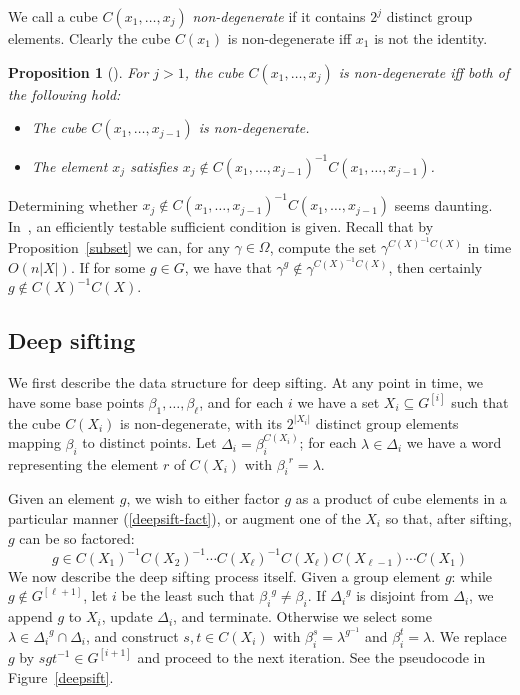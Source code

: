 \documentclass[12pt]{article}
\newtheorem{proposition}[theorem]{Proposition}
\begin{document}
We call a cube $C(x_1,\ldots,x_j)$ {\em non-degenerate}\/ if it
contains $2^j$ distinct group elements.  Clearly the cube
$C(x_1)$ is non-degenerate iff $x_1$ is not the identity.
\begin{proposition}[\cite{BabaiSzemeredi1984}]
  For $j>1$,
  the cube $C(x_1,\ldots,x_j)$ is non-degenerate iff both
  of the following hold:
  \begin{itemize}
    \item The
      cube $C(x_1,\ldots,x_{j-1})$ is non-degenerate.
    \item The element $x_j$ satisfies
      $x_j\not\in C(x_1,\ldots,x_{j-1})^{-1}C(x_1,\ldots,x_{j-1})$.
  \end{itemize}
\end{proposition}
Determining whether $x_j\not\in C(x_1,\ldots,x_{j-1})^{-1}C(x_1,\ldots,x_{j-1})$
seems daunting.
In~\cite{babai1991nearly}, an efficiently testable sufficient condition is
given.  Recall that
by Proposition~\ref{subset} we can, for any $\gamma\in\Omega$,
compute the set $\gamma^{C(X)^{-1}C(X)}$
in time $O(n|X|)$.
If for some $g\in G$,
we have that $\gamma^g\not\in\gamma^{C(X)^{-1}C(X)}$, then certainly 
$g\not\in C(X)^{-1}C(X)$.

\subsection{Deep sifting}
We first describe the
data structure for deep sifting.
At any point in time, we have some base points
$\beta_1,\ldots,\beta_\ell$, and for each $i$
we have a set $X_i\subseteq G^{[i]}$ such that the
cube $C(X_i)$ is non-degenerate,
with its $2^{|X_i|}$ distinct group elements
mapping $\beta_i$ to distinct points.
Let $\Delta_i=\beta_{i}^{C(X_i)}$;
for each $\lambda\in\Delta_i$ we have a word
representing the element $r$ of $C(X_i)$ with ${\beta_i}^r=\lambda$.

Given an element $g$, we wish to either factor $g$
as a product of cube elements
in a particular manner (\ref{deepsift-fact}), or
augment one of the $X_i$ so that, after sifting,
$g$ can be so factored:
\begin{equation}\label{deepsift-fact}
  g \in C(X_1)^{-1}C(X_2)^{-1}\cdots C(X_\ell)^{-1}C(X_\ell)C(X_{\ell-1})\cdots C(X_1)
\end{equation}
We now describe the deep sifting process itself.
Given a group element $g$:
while $g\not\in G^{[\ell+1]}$,
let $i$ be the least such that ${\beta_i}^g\neq\beta_i$.
If ${\Delta_i}^g$ is disjoint from $\Delta_i$, we append $g$ to
$X_i$, update $\Delta_i$, and
terminate.
Otherwise we select some $\lambda\in{\Delta_i}^g \cap \Delta_i$,
and construct $s,t\in C(X_i)$ with $\beta_{i}^s=\lambda^{g^{-1}}$
and $\beta_{i}^t=\lambda$.  We replace $g$ by $s g t^{-1}\in G^{[i+1]}$
and proceed to the next iteration.
See the pseudocode in Figure~\ref{deepsift}.
\end{document}
